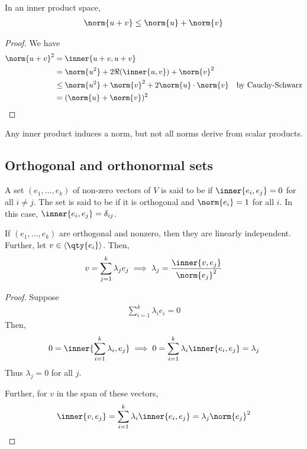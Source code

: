 \begin{corollary}
	In an inner product space,
	\begin{align*}
		\norm{u+v} \leq \norm{u} + \norm{v}
	\end{align*}
\end{corollary}
\begin{proof}
	We have
	\begin{align*}
		\norm{u+v}^2 &= \inner{u+v, u+v} \\
		&= \norm{u^2} + 2 \Re(\inner{u,v}) + \norm{v}^2 \\
		&\leq \norm{u^2} + \norm{v}^2 + 2 \norm{u} \cdot \norm{v} \quad \text{by Cauchy-Schwarz}\\
		&= (\norm{u} + \norm{v})^2
	\end{align*}
\end{proof}
\begin{remark}
	Any inner product induces a norm, but not all norms derive from scalar products.
\end{remark}

\subsection{Orthogonal and orthonormal sets}
\begin{definition}
	A set $(e_1, \dots, e_k)$ of non-zero vectors of $V$ is said to be  if $\inner{e_i, e_j} = 0$ for all $i \neq j$.
	The set is said to be  if it is orthogonal and $\norm{e_i} = 1$ for all $i$.
	In this case, $\inner{e_i, e_j} = \delta_{ij}$.
\end{definition}

\begin{lemma}
	If $(e_1, \dots, e_k)$ are orthogonal and nonzero, then they are linearly independent.
	Further, let $v \in \genset{\qty{e_i}}$.
	Then,
	\begin{align*}
		v = \sum_{j=1}^k \lambda_j e_j \implies \lambda_j = \frac{\inner{v, e_j}}{\norm{e_j}^2}
	\end{align*}
\end{lemma}

\begin{proof}
	Suppose
	\begin{align*}
		\sum_{i=1}^k \lambda_i e_i = 0
	\end{align*}
	Then,
	\begin{align*}
		0 = \inner{\sum_{i=1}^k \lambda_i, e_j} \implies 0 = \sum_{i=1}^k \lambda_i \inner{e_i, e_j} = \lambda_j
	\end{align*}
	Thus $\lambda_j = 0$ for all $j$.

	Further, for $v$ in the span of these vectors,
	\begin{align*}
		\inner{v, e_j} = \sum_{i=1}^k \lambda_i \inner{e_i, e_j} = \lambda_j \norm{e_j}^2
	\end{align*}
\end{proof}

